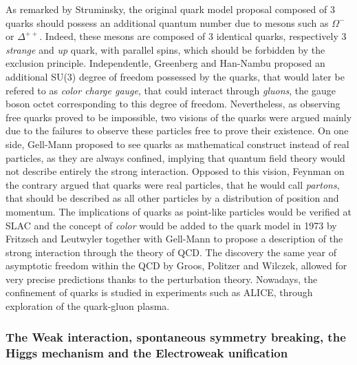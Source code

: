 	As remarked by Struminsky, the original quark model proposal composed of 3 quarks should possess an additional quantum number due to mesons such as $\Omega^-$ or $\Delta^{++}$. Indeed, these mesons are composed of 3 identical quarks, respectively 3 \textit{strange} and \textit{up} quark, with parallel spins, which should be forbidden by the exclusion principle. Independentle, Greenberg and Han-Nambu proposed an additional SU(3) degree of freedom possessed by the quarks, that would later be refered to as \textit{color charge gauge}, that could interact through \textit{gluons}, the gauge boson octet corresponding to this degree of freedom. Nevertheless, as observing free quarks proved to be impossible, two visions of the quarks were argued mainly due to the failures to observe these particles free to prove their existence. On one side, Gell-Mann proposed to see quarks as mathematical construct instead of real particles, as they are always confined, implying that quantum field theory would not describe entirely the strong interaction. Opposed to this vision, Feynman on the contrary argued that quarks were real particles, that he would call \textit{partons}, that should be described as all other particles by a distribution of position and momentum. The implications of quarks as point-like particles would be verified at SLAC and the concept of \textit{color} would be added to the quark model in 1973 by Fritzsch and Leutwyler together with Gell-Mann to propose a description of the strong interaction through the theory of \acf{QCD}. The discovery the same year of asymptotic freedom within the QCD by Groos, Politzer and Wilczek, allowed for very precise predictions thanks to the perturbation theory. Nowadays, the confinement of quarks is studied in experiments such as ALICE, through exploration of the quark-gluon plasma.
	
	\subsubsection*{The Weak interaction, spontaneous symmetry breaking, the Higgs mechanism and the Electroweak unification}
	\label{chapt2:sssec:HiggsEW}
	
